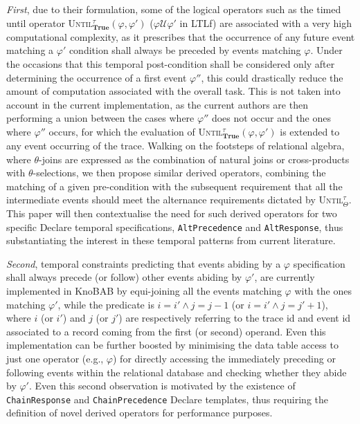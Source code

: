 \documentclass[sigconf]{acmart}
\begin{document}
\textit{First}, due to their formulation, some of the logical operators such as the timed until operator \textsc{Until}$^\tau_\textbf{True}(\varphi,\varphi')$ ($\varphi \mathcal{U}\varphi'$ in LTL\textsf{f}) are associated with a very high computational complexity, as it prescribes that the occurrence of any future event matching a $\varphi'$ condition shall always be preceded by events matching $\varphi$. Under the occasions that this temporal post-condition shall be considered only after determining the occurrence of a first event  $\varphi''$, this could drastically reduce the amount of computation associated with the overall task. This is not taken into account in the current implementation, as the current authors are then performing a union between the cases where $\varphi''$ does not occur and the ones where $\varphi''$ occurs, for which the evaluation of \textsc{Until}$^\tau_\textbf{True}(\varphi,\varphi')$ is extended to any event occurring of the trace. Walking on the footsteps of relational algebra, where $\theta$-joins are expressed as the combination of natural joins \cite{DBLP:books/mg/AtzeniCPT99} or cross-products \cite{10.5555/2842853} with $\theta$-selections, we then propose similar derived operators, combining the matching of a given pre-condition with the subsequent requirement that all the intermediate events should meet the alternance requirements dictated by \textsc{Until}$^\tau_\Theta$. This paper will then contextualise the need for such derived operators for two specific Declare temporal specifications, \texttt{AltPrecedence} and \texttt{AltResponse}, thus substantiating the interest in these temporal patterns from current literature.

\textit{Second}, temporal constraints predicting that events abiding by a $\varphi$ specification shall always precede (or follow) other events abiding by $\varphi'$, are currently implemented in KnoBAB by equi-joining all the events matching  $\varphi$ with the ones matching $\varphi'$, while the predicate is $i=i' \wedge j=j-1$ (or $i=i' \wedge j=j'+1$), where $i$ (or $i'$) and $j$ (or $j'$) are respectively referring to the trace id and event id associated to a record coming from the first (or second) operand. Even this implementation can be further boosted by minimising the data table access to just one operator (e.g., $\varphi$) for directly accessing the immediately preceding or following events within the relational database and checking whether they abide by $\varphi'$. Even this second observation is motivated by the existence of \texttt{ChainResponse} and \texttt{ChainPrecedence} Declare templates, thus requiring the definition of novel derived operators for performance purposes.
\end{document}
